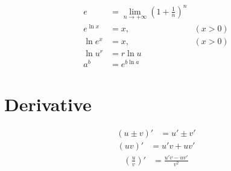 \documentclass[a4paper, 11pt]{book}
\begin{document}
        \begin{align}
            e &= \lim_{n \rightarrow +\infty}\left(1+\frac{1}{n}\right)^{n}\\
            e^{\ln{x}} &= x, &(x > 0)\\
            \ln{e^{x}} &= x, &(x > 0)\\
            \ln{u^{r}} &= r\ln{u}\\
            a^{b} &= e^{b\ln{a}}
        \end{align}
    


    \chapter{Derivative}

    \begin{multicols}{3}
        \begin{align}
            (u \pm v)' &= u' \pm v'
        \end{align}
        \begin{align}
            (uv)' &= u'v+uv'
        \end{align}
        \begin{align}
            \left(\frac{u}{v}\right)' &= \frac{u'v-uv'}{v^{2}}
        \end{align}
    \end{multicols}
\end{document}

